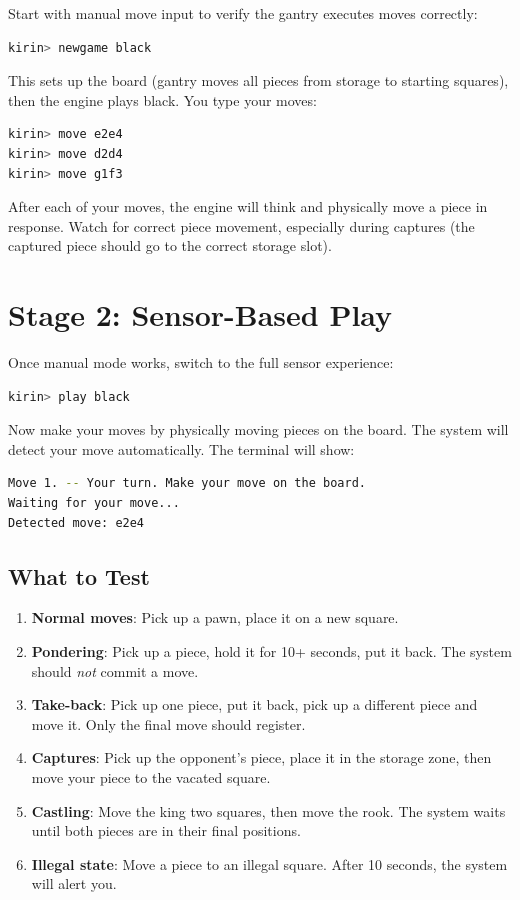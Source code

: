 \documentclass[11pt,a4paper]{report}
\begin{document}
Start with manual move input to verify the gantry executes moves correctly:

\begin{lstlisting}[language=bash, numbers=none]
kirin> newgame black
\end{lstlisting}

This sets up the board (gantry moves all pieces from storage to starting squares), then the engine plays black. You type your moves:

\begin{lstlisting}[language=bash, numbers=none]
kirin> move e2e4
kirin> move d2d4
kirin> move g1f3
\end{lstlisting}

After each of your moves, the engine will think and physically move a piece in response. Watch for correct piece movement, especially during captures (the captured piece should go to the correct storage slot).

\section{Stage 2: Sensor-Based Play}

Once manual mode works, switch to the full sensor experience:

\begin{lstlisting}[language=bash, numbers=none]
kirin> play black
\end{lstlisting}

Now make your moves by physically moving pieces on the board. The system will detect your move automatically. The terminal will show:

\begin{lstlisting}[language=bash, numbers=none]
Move 1. -- Your turn. Make your move on the board.
Waiting for your move...
Detected move: e2e4
\end{lstlisting}

\subsection{What to Test}

\begin{enumerate}
    \item \textbf{Normal moves}: Pick up a pawn, place it on a new square.
    \item \textbf{Pondering}: Pick up a piece, hold it for 10+ seconds, put it back. The system should \emph{not} commit a move.
    \item \textbf{Take-back}: Pick up one piece, put it back, pick up a different piece and move it. Only the final move should register.
    \item \textbf{Captures}: Pick up the opponent's piece, place it in the storage zone, then move your piece to the vacated square.
    \item \textbf{Castling}: Move the king two squares, then move the rook. The system waits until both pieces are in their final positions.
    \item \textbf{Illegal state}: Move a piece to an illegal square. After 10 seconds, the system will alert you.
\end{enumerate}
\end{document}
